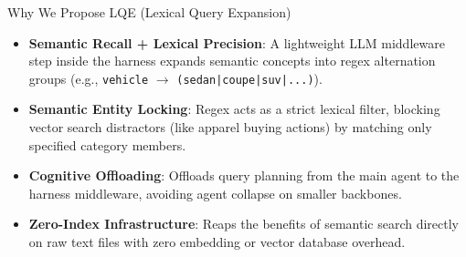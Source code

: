 \documentclass[aspectratio=169]{beamer}
\begin{document}
\begin{frame}{Why We Propose LQE (Lexical Query Expansion)}
    \begin{itemize}
        \item \textbf{Semantic Recall + Lexical Precision}: A lightweight LLM middleware step inside the harness expands semantic concepts into regex alternation groups (e.g., \texttt{vehicle} $\to$ \texttt{(sedan|coupe|suv|...)}).
        \item \textbf{Semantic Entity Locking}: Regex acts as a strict lexical filter, blocking vector search distractors (like apparel buying actions) by matching only specified category members.
        \item \textbf{Cognitive Offloading}: Offloads query planning from the main agent to the harness middleware, avoiding agent collapse on smaller backbones.
        \item \textbf{Zero-Index Infrastructure}: Reaps the benefits of semantic search directly on raw text files with zero embedding or vector database overhead.
    \end{itemize}
\end{frame}
\end{document}
